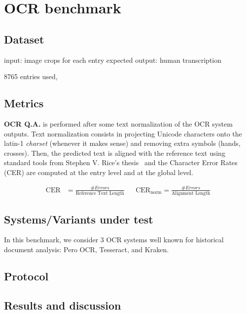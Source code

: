 \section{OCR benchmark}

\subsection{Dataset}
input: image crops for each entry
expected output: human transcription

8765 entries used, 

\subsection{Metrics}
\textbf{OCR Q.A.} is performed after some text normalization of the OCR system outputs. Text normalization consists in
projecting Unicode characters onto the latin-1 \emph{charset} (whenever it makes sense) and removing extra symbols (hands,
crosses). Then, the predicted text is aligned with the reference text using standard tools from Stephen V. Rice's
thesis~\cite{santos.2019.wcmel,neudecker.2021.whdip} and the Character Error Rates (CER) are computed at the entry level
and at the global level. 

\begin{align}
\mathrm{CER} &=  \frac{\#Errors}{\text{Reference Text Length}} & & \mathrm{CER}_\mathrm{norm} =  \frac{\#Errors}{\text{Alignment Length}} 
\end{align}

\subsection{Systems/Variants under test}
In this benchmark, we consider 3 OCR systems well known for historical document analysis: Pero OCR, Tesseract, and Kraken. 

\subsection{Protocol}

\subsection{Results and discussion}

